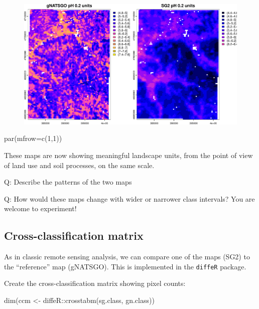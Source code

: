 \documentclass[
  letterpaper,
  DIV=11,
  numbers=noendperiod]{scrartcl}
\newenvironment{Shaded}{\begin{snugshade}}{\end{snugshade}}
\newcommand{\AttributeTok}[1]{\textcolor[rgb]{0.40,0.45,0.13}{#1}}
\newcommand{\DecValTok}[1]{\textcolor[rgb]{0.68,0.00,0.00}{#1}}
\newcommand{\FunctionTok}[1]{\textcolor[rgb]{0.28,0.35,0.67}{#1}}
\newcommand{\NormalTok}[1]{\textcolor[rgb]{0.00,0.23,0.31}{#1}}
\newcommand{\OtherTok}[1]{\textcolor[rgb]{0.00,0.23,0.31}{#1}}
\newcommand{\SpecialCharTok}[1]{\textcolor[rgb]{0.37,0.37,0.37}{#1}}
\begin{document}
\begin{figure}[H]

{\centering \includegraphics{PatternAnalysisWorkshopTutorial_files/figure-pdf/show.classified-cuts-1.pdf}

}

\end{figure}

\begin{Shaded}
\begin{Highlighting}[]
\FunctionTok{par}\NormalTok{(}\AttributeTok{mfrow=}\FunctionTok{c}\NormalTok{(}\DecValTok{1}\NormalTok{,}\DecValTok{1}\NormalTok{))}
\end{Highlighting}
\end{Shaded}

These maps are now showing meaningful landscape units, from the point of
view of land use and soil processes, on the same scale.

Q: Describe the patterns of the two maps

Q: How would these maps change with wider or narrower class intervals?
You are welcome to experiment!

\hypertarget{sec-crosstab}{%
\subsection{Cross-classification matrix}\label{sec-crosstab}}

As in classic remote sensing analysis, we can compare one of the maps
(SG2) to the ``reference'' map (gNATSGO). This is implemented in the
\texttt{diffeR} package.

Create the cross-classification matrix showing pixel counts:

\begin{Shaded}
\begin{Highlighting}[]
\FunctionTok{dim}\NormalTok{(ccm }\OtherTok{\textless{}{-}}\NormalTok{ diffeR}\SpecialCharTok{::}\FunctionTok{crosstabm}\NormalTok{(sg.class, gn.class))}
\end{Highlighting}
\end{Shaded}
\end{document}
